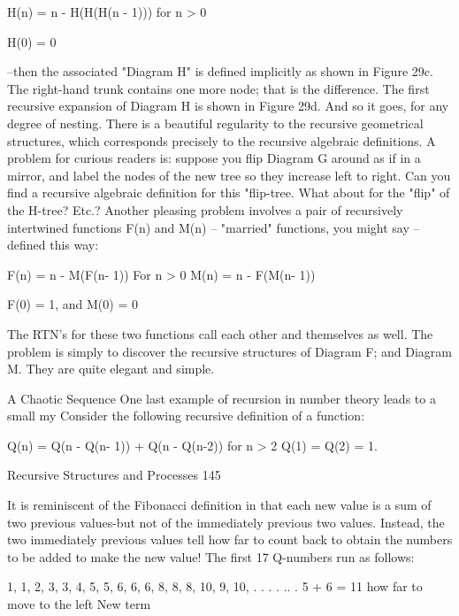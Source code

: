        H(n) = n - H(H(H(n - 1)))      for n > 0

               H(0) = 0

--then the associated "Diagram H" is defined implicitly as shown in Figure 29c. The
right-hand trunk contains one more node; that is the difference. The first recursive
expansion of Diagram H is shown in Figure 29d. And so it goes, for any degree of
nesting. There is a beautiful regularity to the recursive geometrical structures, which
corresponds precisely to the recursive algebraic definitions.
        A problem for curious readers is: suppose you flip Diagram G around as if in a
mirror, and label the nodes of the new tree so they increase left to right. Can you find a
recursive algebraic definition for this "flip-tree. What about for the "flip" of the H-tree?
Etc.?
        Another pleasing problem involves a pair of recursively intertwined functions
F(n) and M(n) -- "married" functions, you might say -- defined this way:

       F(n) = n - M(F(n- 1))
                                                     For n > 0
       M(n) = n - F(M(n- 1))

       F(0) = 1, and M(0) = 0

       The RTN's for these two functions call each other and themselves as well. The
problem is simply to discover the recursive structures of Diagram F; and Diagram M.
They are quite elegant and simple.

                                 A Chaotic Sequence
       One last example of recursion in number theory leads to a small my Consider the
following recursive definition of a function:

       Q(n) = Q(n - Q(n- 1)) + Q(n - Q(n-2))         for n > 2
              Q(1) = Q(2) = 1.


Recursive Structures and Processes                                                      145

It is reminiscent of the Fibonacci definition in that each new value is a sum of two
previous values-but not of the immediately previous two values. Instead, the two
immediately previous values tell how far to count back to obtain the numbers to be added
to make the new value! The first 17 Q-numbers run as follows:

1, 1, 2, 3, 3, 4, 5, 5, 6, 6, 6, 8, 8, 8, 10, 9, 10, . . . .
 .. .                5 + 6 = 11               how far to move to the left
                      New term

